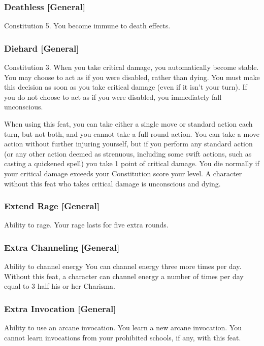 \subsubsection{Deathless [General]}
\featpre Constitution 5.
\featben You become immune to death effects.

\subsubsection{Diehard [General]}
 Constitution 3.
 When you take critical damage, you automatically become stable. You may choose to act as if you were disabled, rather than dying. You must make this decision as soon as you take critical damage (even if it isn't your turn). If you do not choose to act as if you were disabled, you immediately fall unconscious.
\par When using this feat, you can take either a single move or standard action each turn, but not both, and you cannot take a full round action. You can take a move action without further injuring yourself, but if you perform any standard action (or any other action deemed as strenuous, including some swift actions, such as casting a quickened spell) you take 1 point of critical damage. You die normally if your critical damage exceeds your Constitution score \add your level.
 A character without this feat who takes critical damage is unconscious and dying.

\subsubsection{Extend Rage [General]}
 Ability to rage.
 Your rage lasts for five extra rounds.

\subsubsection{Extra Channeling [General]}
 Ability to channel energy
 You can channel energy three more times per day. 
 Without this feat, a character can channel energy a number of times per day equal to 3 \add half his or her Charisma.

\subsubsection{Extra Invocation [General]}
 Ability to use an arcane invocation.
 You learn a new arcane invocation. You cannot learn invocations from your prohibited schools, if any, with this feat.


